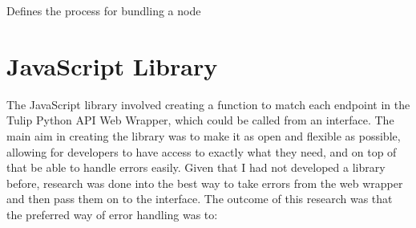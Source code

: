 \documentclass[../dissertation.tex]{subfiles}
\begin{document}
\begin{algorithm}[H]
\caption{Defines the process for bundling a node}
\label{alg:bundle-node}
\begin{algorithmic}
 
        \ELSE
        \ENDIF
    \ENDFOR
\ENDFOR
{}
\ENDFOR
\end{algorithmic}
\end{algorithm}

\section{JavaScript Library}
\label{sec:jslib}

The JavaScript library involved creating a function to match each endpoint in the Tulip Python API Web Wrapper, which could be called from an interface. The main aim in creating the library was to make it as open and flexible as possible, allowing for developers to have access to exactly what they need, and on top of that be able to handle errors easily. Given that I had not developed a library before, research was done into the best way to take errors from the web wrapper and then pass them on to the interface. The outcome of this research was that the preferred way of error handling was to:
\end{document}
